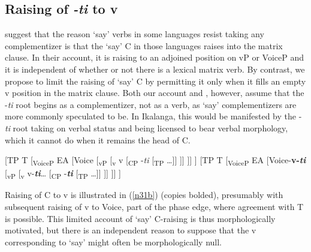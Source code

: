 \documentclass[output=paper,
modfonts
]{langscibook}
\begin{document}
\subsection{Raising of \textit{-ti} to v}\label{sec:letsholo:3.4}

\cite{Diercks2017a} suggest that the reason `say' verbs in some languages resist taking any complementizer is that the `say' C in those languages raises into the matrix clause. In their account, it is raising to an adjoined position on vP or VoiceP and it is independent of whether or not there is a lexical matrix verb. By contrast, we propose to limit the raising of `say' C 
by permitting it only when it fills an empty v position in the matrix clause. Both our account and \citeauthor{Diercks2017a}, however, assume that the -\textit{ti} root begins as a complementizer, not as a verb, as `say' complementizers are more commonly speculated to be. In Ikalanga, this would be manifested by the -\textit{ti} root taking on verbal status and being licensed to bear verbal morphology, which it cannot do when it remains the head of C. 

\ea 
\ea\label{n31a} \textup{[TP T  [\textsubscript{VoiceP} EA [Voice [\textsubscript{vP} [\textsubscript{v} v [\textsubscript{CP} -\textit{ti} [\textsubscript{TP} …]] ]] ]] ]}
\ex\label{n31b}	\textup{[TP T  [\textsubscript{VoiceP} EA [Voice-\textbf{v-\textit{ti}} [\textsubscript{vP} [\textsubscript{v} v-\textbf{\textit{ti}}… [\textsubscript{CP} -\textbf{\textit{ti}} [\textsubscript{TP} …]] ]] ]] ]}
\z \z 

Raising of C to v is illustrated in (\ref{n31b}) (copies bolded), presumably with subsequent raising of v to Voice, part of the phase edge, where agreement with T is possible. This limited account of `say' C-raising is thus morphologically motivated, but there is an independent reason to suppose that the v corresponding to `say' might often be morphologically null.
\end{document}
